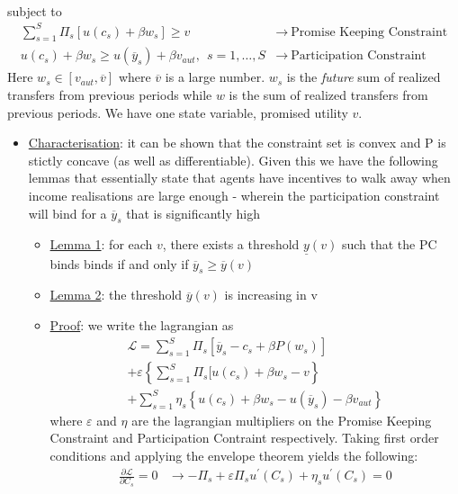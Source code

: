 \documentclass{article}
\begin{document}
\begin{itemize}
\begin{gather*}
    \end{gather*}
    subject to
    \begin{align*}
        \sum_{s=1}^{S} \Pi_{s} [u(c_{s}) + \beta w_{s}] \geq v & \rightarrow \ \text{Promise Keeping Constraint} \\
        u(c_{s}) + \beta w_{s} \geq u(\overline{y}_{s}) + \beta v_{aut}, \ \ s = 1, \dots, S & \rightarrow \ \text{Participation Constraint}
    \end{align*}
    Here $w_{s} \in [v_{aut}, \overline{v}]$ where $\overline{v}$ is a large number. $w_{s}$ is the \textit{future} sum of realized transfers from previous periods while $w$ is the sum of realized transfers from previous periods. We have one state variable, promised utility $v$.
    \begin{itemize}
        \item  \underline{Characterisation}: it can be shown that the constraint set is convex and P is stictly concave (as well as differentiable). Given this we have the following lemmas that essentially state that agents have incentives to walk away when income realisations are large enough - wherein the participation constraint will bind for a $\overline{y}_{s}$ that is significantly high
        \begin{itemize}
            \item \underline{Lemma 1}: for each $v$, there exists a threshold $\underline{y}(v)$ such that the PC binds binds if and only if $\overline{y}_{s} \geq \overline{y}(v)$
            \item  \underline{Lemma 2}: the threshold $\overline{y}(v)$ is increasing in v
            \item  \underline{Proof}: we write the lagrangian as
            \begin{gather*}
                \mathcal{L} = \sum_{s=1}^{S} \Pi_{s} [\overline{y}_{s} - c_{s} + \beta P(w_{s})] \\ + \varepsilon \left\{ \sum_{s=1}^{S} \Pi_{s} [u(c_{s}) + \beta w_{s} - v \right\} \\ +  \sum_{s=1}^{S} \eta_{s} \left\{ u(c_{s}) + \beta w_{s} - u(\overline{y}_{s}) - \beta v_{aut} \right\}
            \end{gather*}
            where $\varepsilon$ and $\eta$ are the lagrangian multipliers on the Promise Keeping Constraint and Participation Contraint respectively. Taking first order conditions and applying the envelope theorem yields the following:
            \begin{align*}
                \frac{\partial \mathcal{L}}{\partial C_{s}} = 0 &\rightarrow -\Pi_{s} + \varepsilon \Pi_{s} u^{'}(C_{s}) + \eta_{s} u^{'} (C_{s}) = 0 \tag{(1)} \\

\end{align*}
\end{itemize}
\end{itemize}
\end{itemize}
\end{document}
